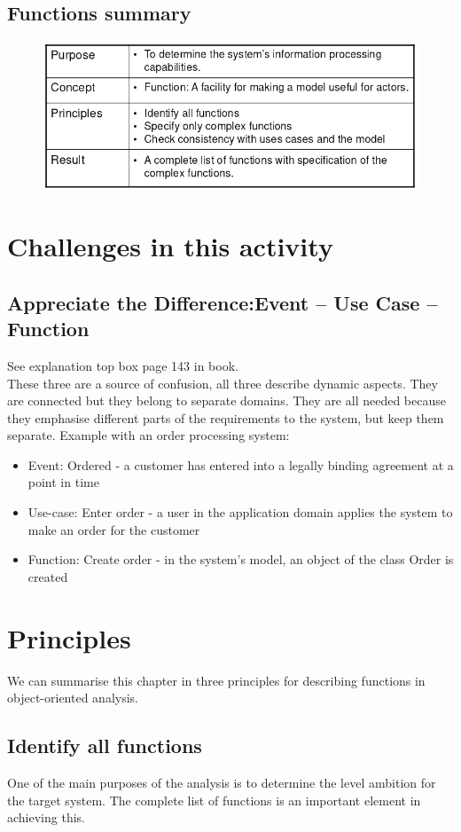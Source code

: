 \subsection{Functions summary}

\begin{figure}[H]
    \centering
    \includegraphics[width=.6\textwidth]{figures/functionssummary.png}
\end{figure}

\section{Challenges in this activity}
\subsection{Appreciate the Difference:Event – Use Case – Function}
See explanation top box page 143 in book.\\ These three are a source of confusion, all three describe dynamic aspects. They are connected but they belong to separate domains. They are all needed because they emphasise different parts of the requirements to the system, but keep them separate.
Example with an order processing system:

\begin{itemize}
    \item Event: Ordered - a customer has entered into a legally binding agreement at a point in time
    \item Use-case: Enter order - a user in the application domain applies the system to make an order for the customer
    \item Function: Create order - in the system's model, an object of the class Order is created
\end{itemize}

\section{Principles}
We can summarise this chapter in three principles for describing functions in object-oriented analysis.

\subsection{Identify all functions}
One of the main purposes of the analysis is to determine the level ambition for the target system. The complete list of functions is an important element in achieving this.


